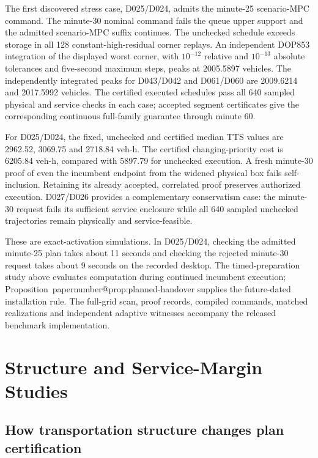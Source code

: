 \documentclass[preprint,12pt]{elsarticle}
\makeatletter
\numberwithin{equation}{section}
\newcommand{\papernumber}[1]{\csname papernumber@#1\endcsname}
\makeatother
\begin{document}
The first discovered stress case, D025/D024, admits the minute-25
scenario-MPC command. The minute-30 nominal command fails the queue upper
support and the admitted scenario-MPC suffix continues. The unchecked
schedule exceeds storage in all 128 constant-high-residual corner replays.
An independent DOP853 integration of the displayed worst corner, with
$10^{-12}$ relative and $10^{-13}$ absolute tolerances and five-second
maximum steps, peaks at 2005.5897 vehicles. The independently integrated
peaks for D043/D042 and D061/D060 are 2009.6214 and 2017.5992 vehicles.
The certified executed schedules pass all 640 sampled physical and service
checks in each case; accepted segment certificates give the corresponding
continuous full-family guarantee through minute 60.

For D025/D024, the fixed, unchecked and certified median TTS values are
2962.52, 3069.75 and 2718.84 veh-h. The certified changing-priority cost
is 6205.84 veh-h, compared with 5897.79 for unchecked execution. A fresh
minute-30 proof of even the incumbent endpoint from the widened physical
box fails self-inclusion. Retaining its already accepted, correlated proof
preserves authorized execution. D027/D026 provides a complementary
conservatism case: the minute-30 request fails its sufficient service
enclosure while all 640 sampled unchecked trajectories remain physically
and service-feasible.

These are exact-activation simulations. In D025/D024, checking the admitted
minute-25 plan takes about 11 seconds and checking the rejected minute-30
request takes about 9 seconds on the recorded desktop. The timed-preparation
study above evaluates computation during continued incumbent execution;
Proposition~\papernumber{prop:planned-handover} supplies the future-dated
installation rule. The full-grid scan, proof records, compiled commands,
matched realizations and independent adaptive witnesses accompany the
released benchmark implementation.

\FloatBarrier
\FloatBarrier
\section{Structure and Service-Margin Studies}
\label{sec:supp-structure}
\subsection{How transportation structure changes plan certification}
\end{document}
